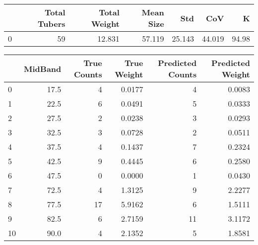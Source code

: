 \begin{tabular}{lrrrrrr}
\toprule
{} &  Total Tubers &  Total Weight &  Mean Size &     Std &     CoV &      K \\
\midrule
0 &            59 &        12.831 &     57.119 &  25.143 &  44.019 &  94.98 \\
\bottomrule
\end{tabular}

\begin{tabular}{lrrrrr}
\toprule
{} &  MidBand &  True Counts &  True Weight &  Predicted Counts &  Predicted Weight \\
\midrule
0  &     17.5 &            4 &       0.0177 &                 4 &            0.0083 \\
1  &     22.5 &            6 &       0.0491 &                 5 &            0.0333 \\
2  &     27.5 &            2 &       0.0238 &                 3 &            0.0293 \\
3  &     32.5 &            3 &       0.0728 &                 2 &            0.0511 \\
4  &     37.5 &            4 &       0.1437 &                 7 &            0.2324 \\
5  &     42.5 &            9 &       0.4445 &                 6 &            0.2580 \\
6  &     47.5 &            0 &       0.0000 &                 1 &            0.0430 \\
7  &     72.5 &            4 &       1.3125 &                 9 &            2.2277 \\
8  &     77.5 &           17 &       5.9162 &                 6 &            1.5111 \\
9  &     82.5 &            6 &       2.7159 &                11 &            3.1172 \\
10 &     90.0 &            4 &       2.1352 &                 5 &            1.8581 \\
\bottomrule
\end{tabular}

